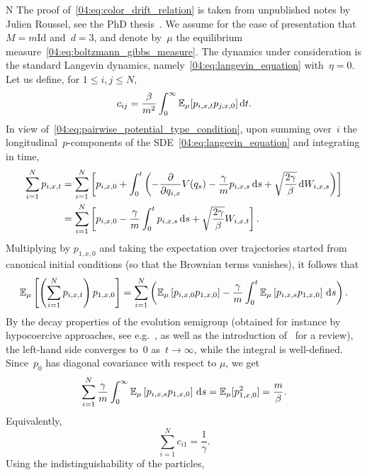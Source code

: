 \label{04:appendix:color_drift}
N
The proof of~\eqref{04:eq:color_drift_relation} is taken from unpublished notes by Julien Roussel, see the PhD thesis~\cite{R18}.
We assume for the ease of presentation that~$M=m\mathrm{Id}$ and~$d=3$, and denote by~$\mu$ the equilibrium measure~\eqref{04:eq:boltzmann_gibbs_measure}. The dynamics under consideration is the standard Langevin dynamics, namely~\eqref{04:eq:langevin_equation} with~$\eta=0$. Let us define, for $1\leq i,j\leq N$,
\[c_{ij}=\frac{\beta}{m^2} \int_{0}^\infty \mathbb{E}_\mu[p_{i,x,t}p_{j,x,0}]\,\mathrm{d} t.\]
In view of~\eqref{04:eq:pairwise_potential_type_condition}, upon summing over~$i$ the longitudinal~$p$-components of the SDE~\eqref{04:eq:langevin_equation} and integrating in time,
\begin{align*}\sum_{i=1}^N p_{i,x,t}&= \sum_{i=1}^N \left[p_{i,x,0}+\int_0^t \left(-\frac{\partial}{\partial q_{i,x}}V(q_s)-\frac{\gamma}{m} p_{i,x,s}\,\mathrm{d} s +\sqrt{\frac{2\gamma}\beta}\,\mathrm{d} W_{i,x,s}\right)\right]\\
    &=\sum_{i=1}^N \left[p_{i,x,0}-\frac{\gamma}{m}\int_0^t  p_{i,x,s}\,\mathrm{d} s +\sqrt{\frac{2\gamma}\beta} W_{i,x,t}\right].\end{align*}
Multiplying by $p_{1,x,0}$ and taking the expectation over trajectories started from canonical initial conditions (so that the Brownian terms vanishes), it follows that
\begin{equation}
    \mathbb{E}_\mu\left[\left(\sum_{i=1}^N p_{i,x,t}\right)p_{1,x,0}\right]=\sum_{i=1}^N\left( \mathbb{E}_\mu\left[p_{i,x,0}p_{1,x,0}\right]-\frac{\gamma}{m}\int_0^t \mathbb{E}_\mu\left[p_{i,x,s}p_{1,x,0}\right]\,\mathrm{d} s\right).
\end{equation}
By the decay properties of the evolution semigroup (obtained for instance by hypocoercive approaches, see e.g.~\cite{V06}, as well as the introduction of~\cite{BFLS22} for a review), the left-hand side converges to~$0$ as~$t\to \infty$, while the integral is well-defined. Since~$p_0$ has diagonal covariance with respect to $\mu$, we get
\begin{equation}
    \sum_{i=1}^N \frac{\gamma}m\int_0^\infty \mathbb{E}_\mu\left[p_{i,x,s}p_{1,x,0}\right]\,\mathrm{d} s=\mathbb{E}_\mu[p_{1,x,0}^2]=\frac{m}{\beta}.
\end{equation}
Equivalently, 
\begin{equation}
\label{04:eq:color_drift_relation_proof}
\sum_{i=1}^N c_{i1}=\frac{1}{\gamma}.\end{equation}
Using the indistinguishability of the particles,

